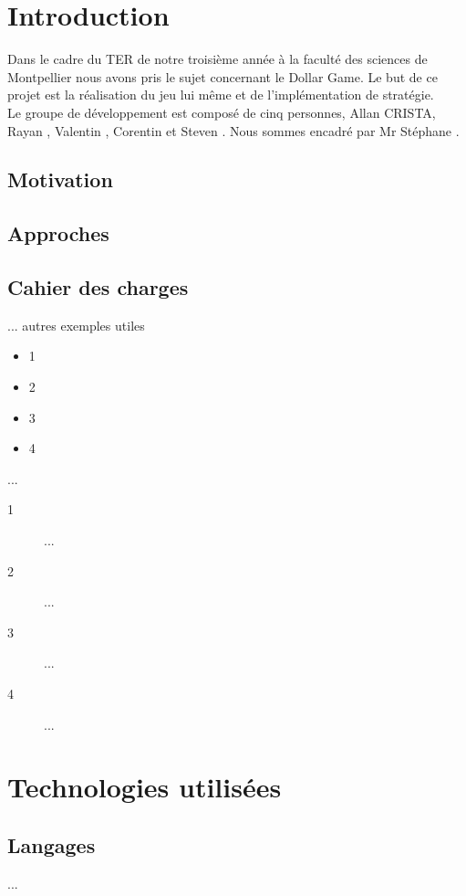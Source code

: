 \documentclass[twoside]{report}
\begin{document}
\chapter*{Introduction} %
Dans le cadre du TER de notre troisième année à la faculté des sciences de Montpellier nous avons pris le sujet concernant le Dollar Game. Le but de ce projet est la réalisation du jeu lui même et de l'implémentation de stratégie.\\

Le groupe de développement est composé de cinq personnes, Allan \textsc{CRISTA}, Rayan , Valentin , Corentin  et Steven . Nous sommes encadré par Mr Stéphane .

\section*{Motivation}


\section*{Approches}


\section*{Cahier des charges}
...
autres exemples utiles
\begin{itemize}[label=$-$]
    \item 1
    \item 2
    \item 3
    \item 4
\end{itemize}
...
\begin{description}
    \item[1] ...
    \item[2] ...
    \item[3] ...
    \item[4] ...

\end{description}

\chapter{Technologies utilisées}
\section{Langages}
...
\end{document}
